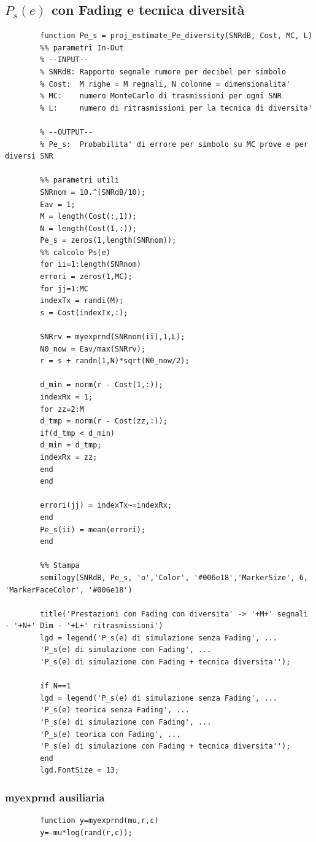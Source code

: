 \documentclass[12pt, a4paper]{article}
\begin{document}
	\subsection{\(P_s(e)\) con Fading e tecnica diversità}
	\begin{lstlisting}
		function Pe_s = proj_estimate_Pe_diversity(SNRdB, Cost, MC, L)
		%% parametri In-Out
		% --INPUT--
		% SNRdB: Rapporto segnale rumore per decibel per simbolo
		% Cost:  M righe = M regnali, N colonne = dimensionalita'
		% MC:    numero MonteCarlo di trasmissioni per ogni SNR
		% L:     numero di ritrasmissioni per la tecnica di diversita'
		
		% --OUTPUT--
		% Pe_s:  Probabilita' di errore per simbolo su MC prove e per diversi SNR
		
		%% parametri utili
		SNRnom = 10.^(SNRdB/10);
		Eav = 1;
		M = length(Cost(:,1));
		N = length(Cost(1,:));
		Pe_s = zeros(1,length(SNRnom));
		%% calcolo Ps(e)
		for ii=1:length(SNRnom)
		errori = zeros(1,MC);
		for jj=1:MC
		indexTx = randi(M);
		s = Cost(indexTx,:);
		
		SNRrv = myexprnd(SNRnom(ii),1,L);        
		N0_now = Eav/max(SNRrv);        
		r = s + randn(1,N)*sqrt(N0_now/2);
		
		d_min = norm(r - Cost(1,:));
		indexRx = 1;
		for zz=2:M
		d_tmp = norm(r - Cost(zz,:));
		if(d_tmp < d_min)
		d_min = d_tmp;
		indexRx = zz;
		end           
		end
		
		errori(jj) = indexTx~=indexRx; 
		end
		Pe_s(ii) = mean(errori);
		end
		
		%% Stampa 
		semilogy(SNRdB, Pe_s, 'o','Color', '#006e18','MarkerSize', 6, 'MarkerFaceColor', '#006e18')
		
		title('Prestazioni con Fading con diversita' -> '+M+' segnali - '+N+' Dim - '+L+' ritrasmissioni')
		lgd = legend('P_s(e) di simulazione senza Fading', ...
		'P_s(e) di simulazione con Fading', ...
		'P_s(e) di simulazione con Fading + tecnica diversita'');
		
		if N==1
		lgd = legend('P_s(e) di simulazione senza Fading', ...
		'P_s(e) teorica senza Fading', ...
		'P_s(e) di simulazione con Fading', ...
		'P_s(e) teorica con Fading', ...
		'P_s(e) di simulazione con Fading + tecnica diversita'');
		end
		lgd.FontSize = 13;
	\end{lstlisting}
	\subsubsection{myexprnd ausiliaria}
	\begin{lstlisting}
		function y=myexprnd(mu,r,c)
		y=-mu*log(rand(r,c));
	\end{lstlisting}
	
\end{document}
